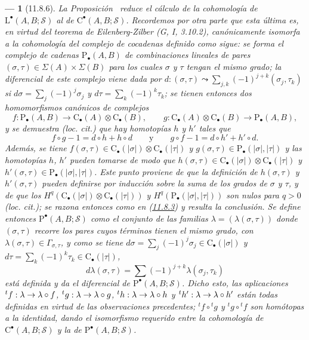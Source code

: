 \documentclass[10pt,oneside,openany]{book}
\theoremstyle{egaenv}\newtheorem*{env}{---}
\theoremstyle{egastatement}
\theoremstyle{egadescription}
\newcommand{\oldpage}[2][]{\marginnote{\normalfont\scriptsize\textbf{#1}\,|\,#2}\ignorespaces}
\renewcommand{\to}{\mathchoice{\longrightarrow}{\rightarrow}{\rightarrow}{\rightarrow}}
\begin{document}
\begin{env}[11.8.6]
\label{0.11.8.6}
\label{0.11.8.6-fr}
\oldpage[0\textsubscript{III}]{45}
La Proposición~ reduce el cálculo de la cohomología de
$\mathrm L^\bullet(A,B;\mathscr S)$ al de
$\mathrm C^\bullet(A,B;\mathscr S)$. Recordemos por otra parte que esta última es, en virtud del teorema de Eilenberg-Zilber (G, I, 3.10.2), canónicamente isomorfa a la cohomología del complejo de cocadenas definido como sigue: se forma el complejo de cadenas $\mathrm P_\bullet(A,B)$ de combinaciones lineales de pares
$(\sigma,\tau)\in\Sigma(A)\times\Sigma(B)$ para los cuales $\sigma$ y
$\tau$ tengan \emph{el mismo grado}; la diferencial de este complejo
viene dada por
$d:(\sigma,\tau)\leadsto\sum_{j,k}(-1)^{j+k}(\sigma_j,\tau_k)$ si
$d\sigma=\sum_j(-1)^j\sigma_j$ y $d\tau=\sum_k(-1)^k\tau_k$;
se tienen entonces dos homomorfismos canónicos de complejos
\[
f:\mathrm P_\bullet(A,B)\longrightarrow
\mathrm C_\bullet(A)\otimes\mathrm C_\bullet(B),\qquad
g:\mathrm C_\bullet(A)\otimes\mathrm C_\bullet(B)
\longrightarrow\mathrm P_\bullet(A,B),
\] y se demuestra (\emph{loc. cit.}) que hay \emph{homotopías} $h$ y $h'$ tales que
\[
f\circ g-1=d\circ h+h\circ d\qquad\text{y}\qquad
g\circ f-1=d\circ h'+h'\circ d.
\]
Además, se tiene $f(\sigma,\tau)\in\mathrm C_\bullet(|\sigma|)
\otimes\mathrm C_\bullet(|\tau|)$ y $g(\sigma,\tau)\in\mathrm P_\bullet(|\sigma|,|\tau|)$ y las homotopías $h$, $h'$ \emph{pueden tomarse de modo que} $h(\sigma,\tau)\in\mathrm C_\bullet(|\sigma|)
\otimes\mathrm C_\bullet(|\tau|)$ \emph{y} $h'(\sigma,\tau)\in\mathrm P_\bullet(|\sigma|,|\tau|)$. Este punto proviene de que la definición de $h(\sigma,\tau)$ y $h'(\sigma,\tau)$ pueden definirse por
\emph{inducción} sobre la suma de los grados de $\sigma$ y $\tau$, y de que los
$H^q(\mathrm C_\bullet(|\sigma|)\otimes\mathrm C_\bullet(|\tau|))$ y
$H^q(\mathrm P_\bullet(|\sigma|,|\tau|))$
son \emph{nulos} para $q>0$ (\emph{loc. cit.}); se razona entonces como en (\hyperref[0.11.8.3-fr]{11.8.3}) y resulta la conclusión. Se define entonces $\mathrm P^\bullet(A,B;\mathscr S)$ como el conjunto de las familias $\lambda=(\lambda(\sigma,\tau))$ donde $(\sigma,\tau)$ recorre los pares cuyos términos tienen el mismo grado, con $\lambda(\sigma,\tau)\in\Gamma_{\sigma,\tau}$, y como se tiene $d\sigma=\sum_j(-1)^j\sigma_j\in\mathrm C_\bullet(|\sigma|)$ y $d\tau=\sum_k(-1)^k\tau_k\in\mathrm C_\bullet(|\tau|)$,
\[
d\lambda(\sigma,\tau)=
\sum(-1)^{j+k}\lambda(\sigma_j,\tau_k)
\]
está definida y da el diferencial de
$\mathrm P^\bullet(A,B;\mathscr S)$. Dicho esto, las aplicaciones ${}^tf:\lambda\to\lambda\circ f$, ${}^tg:\lambda\to\lambda\circ g$, ${}^th:\lambda\to\lambda\circ h$ y ${}^th':\lambda\to\lambda\circ h'$ están todas \emph{definidas} en virtud de las observaciones precedentes;
${}^tf\circ{}^tg$ y ${}^tg\circ{}^tf$ son homótopas a la
identidad, dando el isomorfismo requerido entre la cohomología de
$\mathrm C^\bullet(A,B;\mathscr S)$ y la de
$\mathrm P^\bullet(A,B;\mathscr S)$.
\end{env}
\end{document}

